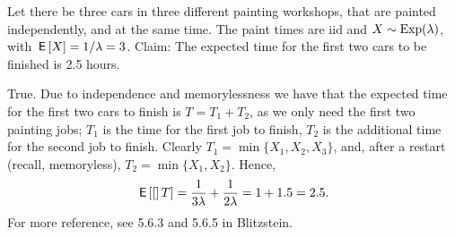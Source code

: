 \documentclass[tf-tutorial-all.tex]{subfiles}
\begin{document}
\begin{truefalse}
Let there be three cars in three different painting workshops, that are painted independently, and at the same time. The paint times are iid and $X\sim \mathrm{Exp}(\lambda)$, with $\,\mathsf{E}\left[X\right] = 1/ \lambda = 3$.
Claim: The expected time for the first two cars to be finished is 2.5 hours.

\begin{solution}
True.
Due to independence and memorylessness we have that the expected time for the first two cars to finish is $ T = T_{1} + T_{2}$, as we only need the first two painting jobs;
$T_{1}$ is the time for the first job to finish, $T_{2}$ is the additional time for the second job to finish.
Clearly $T_{1} = \min\{X_{1}, X_{2}, X_{3}\}$,  and, after a restart (recall, memoryless), $T_{2} = \min\{X_{1}, X_{2}\}$. Hence,
\begin{equation*}
\,\mathsf{E}\left[[\right]T] = \frac{1}{3 \lambda} + \frac{1}{2\lambda} = 1 + 1.5 = 2.5.
\end{equation*}
For more reference, see 5.6.3 and 5.6.5 in Blitzstein.
\end{solution}
\end{truefalse}
\end{document}
